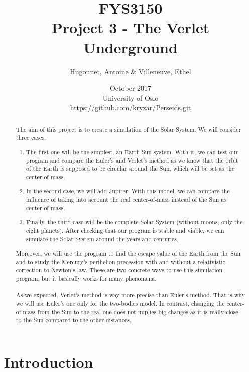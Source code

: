 \documentclass[a4paper, twoside, 11pt]{report}
\title{FYS3150\\Project 3 - The Verlet Underground}
\author{Hugounet, Antoine \& Villeneuve, Ethel}
\date{October 2017 \\University of Oslo \\ \url{https://github.com/kryzar/Perseids.git}}
\theoremstyle{theorem}
\theoremstyle{remark}
\theoremstyle{exemple}
\begin{document}
\maketitle
	
	
\begin{abstract}

	\paragraph{}The aim of this project is to create a simulation of the Solar System. We will consider three cases.
		\begin{enumerate}
			\item{The first one will be the simplest, an Earth-Sun system. With it, we can test our program and compare the Euler's and Verlet's method as we know that the orbit of the Earth is supposed to be circular around the Sun, which will be set as the center-of-mass.}
			\item{In the second case, we will add Jupiter. With this model, we can compare the influence of taking into account the real center-of-mass instead of the Sun as center-of-mass.}
			\item{Finally, the third case will be the complete Solar System (without moons, only the eight planets). After checking that our program is stable and viable, we can simulate the Solar System around the years and centuries.}
		\end{enumerate}
		
	Moreover, we will use the program to find the escape value of the Earth from the Sun and to study the Mercury's perihelion precession with and without a relativistic correction to Newton's law. These are two concrete ways to use this simulation program, but it basically works for many phenomena.
	
	\paragraph{}As we expected, Verlet's method is way more precise than Euler's method. That is why we will use Euler's one only for the two-bodies model. In contrast, changing the center-of-mass from the Sun to the real one does not implies big changes as it is really close to the Sun compared to the other distances.  
	
\end{abstract}


\tableofcontents


\chapter*{Introduction}
\end{document}
